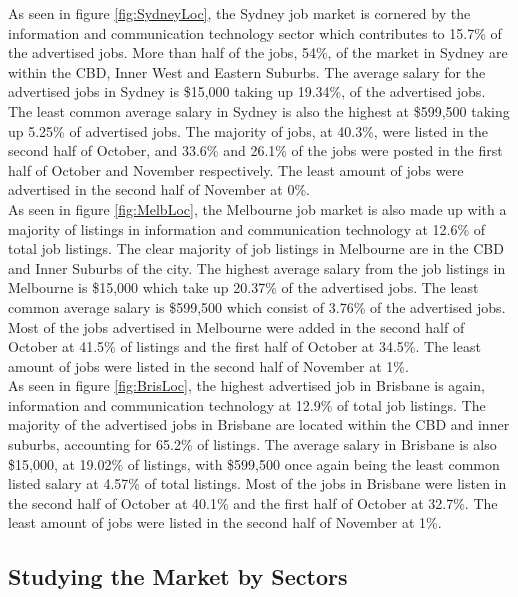 \documentclass[twoside, 12pt, a4paper]{article}
\begin{document}
As seen in figure \ref{fig:SydneyLoc}, the Sydney job market is cornered by the information and communication technology sector which contributes to 15.7\% of the advertised jobs. More than half of the jobs, 54\%, of the market in Sydney are within the CBD, Inner West and Eastern Suburbs. The average salary for the advertised jobs in Sydney is \$15,000 taking up 19.34\%, of the advertised jobs. The least common average salary in Sydney is also the highest at \$599,500 taking up 5.25\% of advertised jobs. The majority of jobs, at 40.3\%, were listed in the second half of October, and 33.6\% and 26.1\% of the jobs were posted in the first half of October and November respectively. The least amount of jobs were advertised in the second half of November at 0\%.\\
As seen in figure \ref{fig:MelbLoc}, the Melbourne job market is also made up with a majority of listings in information and communication technology at 12.6\% of total job listings. The clear majority of job listings in Melbourne are in the CBD and Inner Suburbs of the city. The highest average salary from the job listings in Melbourne is \$15,000 which take up 20.37\% of the advertised jobs. The least common average salary is \$599,500 which consist of 3.76\% of the advertised jobs. Most of the jobs advertised in Melbourne were added in the second half of October at 41.5\% of listings and the first half of October at 34.5\%. The least amount of jobs were listed in the second half of November at 1\%.\\
As seen in figure \ref{fig:BrisLoc}, the highest advertised job in Brisbane is again, information and communication technology at 12.9\% of total job listings. The majority of the advertised jobs in Brisbane are located within the CBD and inner suburbs, accounting for 65.2\% of listings. The average salary in Brisbane is also \$15,000, at 19.02\% of listings, with \$599,500 once again being the least common listed salary at 4.57\% of total listings. Most of the jobs in Brisbane were listen in the second half of October at 40.1\% and the first half of October at 32.7\%. The least amount of jobs were listed in the second half of November at 1\%. 

\newpage
\subsection{Studying the Market by Sectors}
\end{document}
